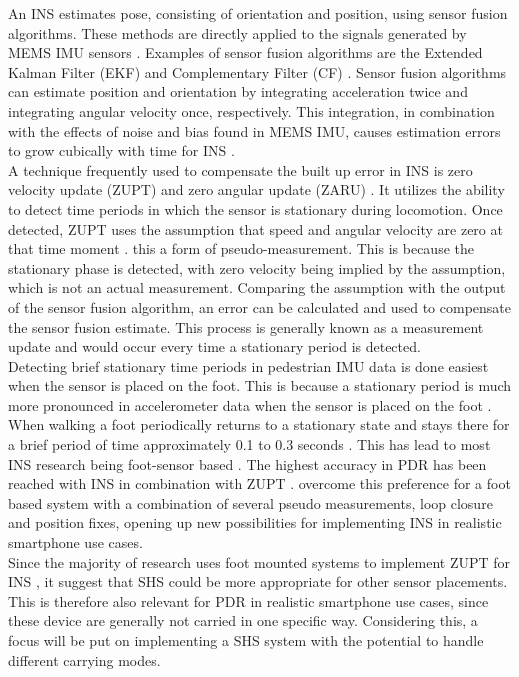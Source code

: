 An \ac{INS} estimates pose, consisting of orientation and position, using sensor fusion algorithms. These methods are directly applied to the signals generated by MEMS IMU sensors \cite{Wu2019}. Examples of sensor fusion algorithms are the Extended Kalman Filter (EKF) and Complementary Filter (CF) \cite{Kok2017}. Sensor fusion algorithms can estimate position and orientation by integrating acceleration twice and integrating angular velocity once, respectively. This integration, in combination with the effects of noise and bias found in MEMS IMU, causes estimation errors to grow cubically with time for INS \cite{Harle2013}. \\
\newline
A technique frequently used to compensate the built up error in INS is zero velocity update (ZUPT) and zero angular update (ZARU) \cite{Harle2013}. It utilizes the ability to detect time periods in which the sensor is stationary during locomotion. Once detected, ZUPT uses the assumption that speed and angular velocity are zero at that time moment \cite{Wu2019,Harle2013}. this a form of pseudo-measurement. This is because the stationary phase is detected, with zero velocity being implied by the assumption, which is not an actual measurement. Comparing the assumption with the output of the sensor fusion algorithm, an error can be calculated and used to compensate the sensor fusion estimate. This process is generally known as a measurement update and would occur every time a stationary period is detected.\\
\newline
Detecting brief stationary time periods in pedestrian IMU data is done easiest when the sensor is placed on the foot. This is because a stationary period is much more pronounced in accelerometer data when the sensor is placed on the foot \cite{Yu2019,Wu2019}.  When walking a foot periodically returns to a stationary state and stays there for a brief period of time approximately 0.1 to 0.3 seconds \cite{Ren2016a}. This has lead to most \ac{INS} research being foot-sensor based \cite{Diez2018,Wu2019}. The highest accuracy in PDR has been reached with INS in combination with ZUPT \cite{Hardegger2012}. \citet{Solin2018a} overcome this preference for a foot based system with a combination of several pseudo measurements, loop closure and position fixes, opening up new possibilities for implementing INS in realistic smartphone use cases.\\
Since the majority of research uses foot mounted systems to implement ZUPT for INS \cite{Wu2019}, it suggest that SHS could be more appropriate for other sensor placements. This is therefore also relevant for PDR in realistic smartphone use cases, since these device are generally not carried in one specific way. Considering this, a focus will be put on implementing a SHS system with the potential to handle different carrying modes. \\



